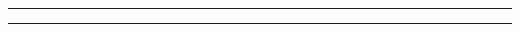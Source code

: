 \documentclass[11pt]{article}
\title{\vspace{-2em}\LARGE{}\vspace{-1em}}
\author{Minghang Li}
\date{\vspace{-1em}}
\begin{document}
\maketitle \thispagestyle{fancy}

\bigskip
\hrule \vspace{1pt}
\hrule height 1pt
\bigskip


\printbibliography
\end{document}
